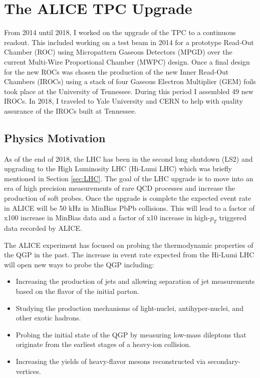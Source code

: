 \chapter{The ALICE TPC Upgrade} \label{ch:tpcu}

From 2014 until 2018, I worked on the upgrade of the TPC to a continuous readout.  This included working on a test beam in 2014 for a prototype Read-Out Chamber (ROC) using Micropattern Gaseous Detectors (MPGD) over the current Multi-Wire Proportional Chamber (MWPC) design.  Once a final design for the new ROCs was chosen the production of the new Inner Read-Out Chambers (IROCs) using a stack of four Gaseous Electron Multiplier (GEM) foils took place at the University of Tennessee.  During this period I assembled 49 new IROCs.  In 2018, I traveled to Yale University and CERN to help with quality assurance of the IROCs built at Tennessee.


\section{Physics Motivation}
As of the end of 2018, the LHC has been in the second long shutdown (LS2) and upgrading to the High Luminosity LHC (Hi-Lumi LHC)\cite{Apollinari:2015bam} which was briefly mentioned in Section \ref{sec:LHC}.  The goal of the LHC upgrade is to move into an era of high precision measurements of rare QCD processes and increase the production of soft probes.  Once the upgrade is complete the expected event rate in ALICE will be 50 kHz in MinBias PbPb collisions.  This will lead to a factor of x100 increase in MinBias data and a factor of x10 increase in high-$p_{T}$ triggered data recorded by ALICE.

The ALICE experiment has focused on probing the thermodynamic properties of the QGP in the past.  The increase in event rate expected from the Hi-Lumi LHC will open new ways to probe the QGP including\cite{Abelev:1475243}:

\begin{itemize}
\item Increasing the production of jets and allowing separation of jet measurements based on the flavor of the initial parton.
\item Studying the production mechanisms of light-nuclei, antihyper-nuclei, and other exotic hadrons.
\item Probing the initial state of the QGP by measuring low-mass dileptons that originate from the earliest stages of a heavy-ion collision.
\item Increasing the yields of heavy-flavor mesons reconstructed via secondary-vertices. 
\end{itemize}

